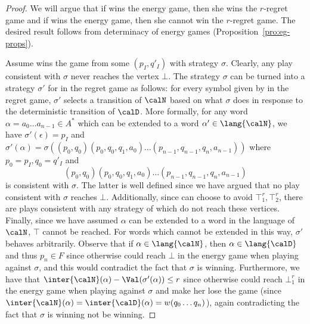 \documentclass[a4paper]{article}
\begin{document}
\begin{proof}
	We will argue that if \eve wins the energy game, then she wins the
	$r$-regret game and if \adam wins the energy game, then she cannot win
	the $r$-regret game. The desired result follows from determinacy of
	energy games (Proposition~\ref{pro:eg-props}).

	Assume \eve wins the game from some $(p_I,q'_I)$ with strategy $\sigma$.
	Clearly, any play consistent with $\sigma$ never reaches the vertex
	$\bot$. The strategy $\sigma$ can be turned into a strategy $\sigma'$
	for \eve in the regret game as follows: for every symbol given by \adam
	in the regret game, $\sigma'$ selects a transition of $\calN$ based on
	what $\sigma$ does in response to the deterministic transition of
	$\calD$. More formally, for any word $\alpha = a_0 \dots a_{n-1} \in
	A^*$ which can be extended to a word $\alpha' \in \lang{\calN}$, we have
	$\sigma'(\epsilon) = p_I$ and $\sigma'(\alpha) = \sigma\left(
	(p_0,q_0) (p_0,q_0,q_1,a_0) \dots (p_{n-1},q_{n-1},q_n,a_{n-1}) \right)$
	where $p_0 = p_I, q_0 = q'_I$ and
	\[
		(p_0,q_0) (p_0,q_0,q_1,a_0) \dots (p_{n-1},q_{n-1},q_n,a_{n-1})
	\]
	is consistent with $\sigma$. The latter
	is well defined since we have argued that no play consistent with
	$\sigma$ reaches $\bot$. Additionally, since \adam can choose to avoid
	$\top^r_1,\top^r_2$, there are plays consistent with any strategy of
	\eve which do not reach these vertices. Finally, since we have assumed
	$\alpha$ can be extended to a word in the language of $\calN$, $\top$
	cannot be reached. For words which cannot be extended in this way,
	$\sigma'$ behaves arbitrarily. Observe that if $\alpha \in
	\lang{\calN}$, then $\alpha \in \lang{\calD}$ and thus $p_n \in F$ since
	otherwise \adam could reach $\bot$ in the energy game when playing
	against $\sigma$, and this would contradict the fact that $\sigma$ is
	winning. Furthermore, we have that $\inter{\calN}(\alpha) -
	\Val(\sigma'(\alpha)) \le r$ since otherwise \adam could reach
	$\bot^r_1$ in the energy game when playing against $\sigma$ and make her
	lose the game (since $\inter{\calN}(\alpha) = \inter{\calD}(\alpha) =
	w(q_0 \dots q_n)$), again contradicting the fact that $\sigma$ is
	winning not be winning.


\end{proof}
\end{document}

